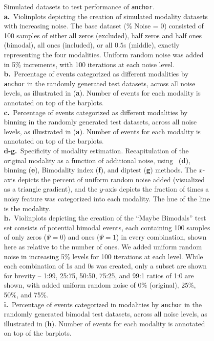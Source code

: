 \clearpage
\thispagestyle{facingcaption}
\begin{figure}[h]
\captionsetup{labelformat=prev-page}
\caption[Simulated datasets to test performance of \texttt{anchor}.]{
Simulated datasets to test performance of \texttt{anchor}.\\
\textbf{a.}~Violinplots depicting the creation of simulated modality datasets with increasing noise. The base dataset (\% Noise = 0) consisted of 100 samples of either all zeros (excluded), half zeros and half ones (bimodal), all ones (included), or all $0.5$s (middle), exactly representing the four modalities. Uniform random noise was added in 5\% increments, with 100 iterations at each noise level.
\textbf{b.}~Percentage of events categorized as different modalities by \texttt{anchor} in the randomly generated test datasets, across all noise levels, as illustrated in (\textbf{a}). Number of events for each modality is annotated on top of the barplots. \\
\textbf{c.}~Percentage of events categorized as different modalities by binning in the randomly generated test datasets, across all noise levels, as illustrated in (\textbf{a}). Number of events for each modality is annotated on top of the barplots. \\
\textbf{d-g.}~Specificity of modality estimation. Recapitulation of the original modality as a function of additional noise, using \anchor\, (\textbf{d}), binning (\textbf{e}), Bimodality index (\textbf{f}), and diptest (\textbf{g}) methods. The $x$-axis depicts the percent of uniform random noise added (visualized as a triangle gradient), and the $y$-axis depicts the fraction of times a noisy feature was categorized into each modality. The hue of the line is the modality. \\
\textbf{h.}~Violinplots depicting the creation of the ``Maybe Bimodals'' test set consists of potential bimodal events, each containing 100 samples of only zeros ($\Psi = 0$) and ones ($\Psi = 1$) in every combination, shown here as relative to the number of ones. We added uniform random noise in increasing 5\% levels for 100 iterations at each level. While each combination of 1s and 0s was created, only a subset are shown for brevity -- 1:99, 25:75, 50:50, 75:25, and 99:1 ratios of 1:0 are shown, with added uniform random noise of 0\% (original), 25\%, 50\%, and 75\%.\\
\textbf{i.}~Percentage of events categorized in modalities by \texttt{anchor} in the randomly generated bimodal test datasets, across all noise levels, as illustrated in (\textbf{h}). Number of events for each modality is annotated on top of the barplots. \\
}
\end{figure}
